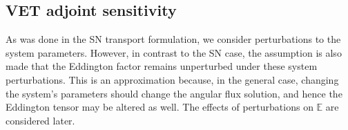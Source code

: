 \documentclass[12pt]{report}
\newcommand{\Edd}{\mathbb{E}}
\begin{document}
\subsection{VET adjoint sensitivity}

As was done in the SN transport formulation, we consider perturbations to the system parameters. However, in contrast to the SN case, the assumption is also made that the Eddington factor remains unperturbed under these system perturbations. This is an approximation because, in the general case, changing the system's parameters should change the angular flux solution, and hence
the Eddington tensor may be altered as well. The effects of perturbations on $\Edd$ are considered later.
\end{document}
